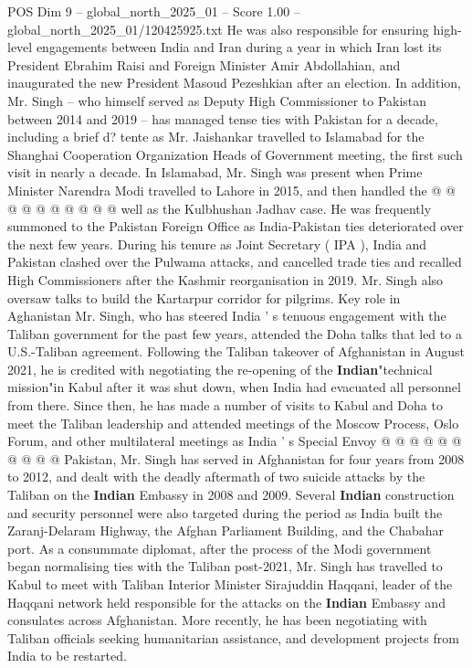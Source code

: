 \begin{textsample}{POS Dim 9 – global\_north\_2025\_01 – Score 1.00 – global\_north\_2025\_01/120425925.txt}
He was also responsible for ensuring high-level engagements between India and Iran during a year in which Iran lost its President Ebrahim Raisi and Foreign Minister Amir Abdollahian, and inaugurated the new President Masoud Pezeshkian after an election.
In addition, Mr.
Singh -- who himself served as Deputy High Commissioner to Pakistan between 2014 and 2019 -- has managed tense ties with Pakistan for a decade, including a brief d? tente as Mr.
Jaishankar travelled to Islamabad for the Shanghai Cooperation Organization Heads of Government meeting, the first such visit in nearly a decade.
In Islamabad, Mr.
Singh was present when Prime Minister Narendra Modi travelled to Lahore in 2015, and then handled the @ @ @ @ @ @ @ @ @ @ well as the Kulbhushan Jadhav case.
He was frequently summoned to the Pakistan Foreign Office as India-Pakistan ties deteriorated over the next few years.
During his tenure as Joint Secretary ( IPA ), India and Pakistan clashed over the Pulwama attacks, and cancelled trade ties and recalled High Commissioners after the Kashmir reorganisation in 2019.
Mr.
Singh also oversaw talks to build the Kartarpur corridor for pilgrims.
Key role in Aghanistan Mr.
Singh, who has steered India ' s tenuous engagement with the Taliban government for the past few years, attended the Doha talks that led to a U.S.-Taliban agreement.
Following the Taliban takeover of Afghanistan in August 2021, he is credited with negotiating the re-opening of the \textbf{Indian}"technical mission"in Kabul after it was shut down, when India had evacuated all personnel from there.
Since then, he has made a number of visits to Kabul and Doha to meet the Taliban leadership and attended meetings of the Moscow Process, Oslo Forum, and other multilateral meetings as India ' s Special Envoy @ @ @ @ @ @ @ @ @ @ Pakistan, Mr.
Singh has served in Afghanistan for four years from 2008 to 2012, and dealt with the deadly aftermath of two suicide attacks by the Taliban on the \textbf{Indian} Embassy in 2008 and 2009.
Several \textbf{Indian} construction and security personnel were also targeted during the period as India built the Zaranj-Delaram Highway, the Afghan Parliament Building, and the Chabahar port.
As a consummate diplomat, after the process of the Modi government began normalising ties with the Taliban post-2021, Mr.
Singh has travelled to Kabul to meet with Taliban Interior Minister Sirajuddin Haqqani, leader of the Haqqani network held responsible for the attacks on the \textbf{Indian} Embassy and consulates across Afghanistan.
More recently, he has been negotiating with Taliban officials seeking humanitarian assistance, and development projects from India to be restarted.

\end{textsample}
